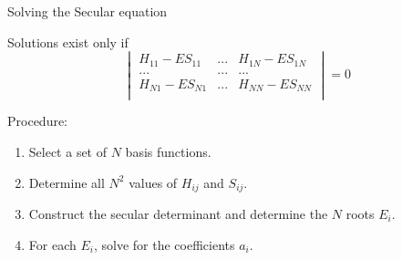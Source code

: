 \documentclass[aspectratio=169]{beamer}
\begin{document}
    \begin{frame}{Solving the Secular equation}

        Solutions exist only if
        \begin{equation*}
            \begin{vmatrix}
                H_{11}-ES_{11} & ... & H_{1N}-ES_{1N} \\
                ...            & ... & ...            \\
                H_{N1}-ES_{N1} & ... & H_{NN}-ES_{NN} \\
            \end{vmatrix}
            = 0
        \end{equation*}

        Procedure:
        \begin{enumerate}
            \item Select a set of $N$ basis functions.
            \item Determine all $N^2$ values of $H_{ij}$ and $S_{ij}$.
            \item Construct the secular determinant and determine the $N$ roots $E_i$.
            \item For each $E_i$, solve for the coefficients $a_i$.
        \end{enumerate}
    \end{frame}
\end{document}
